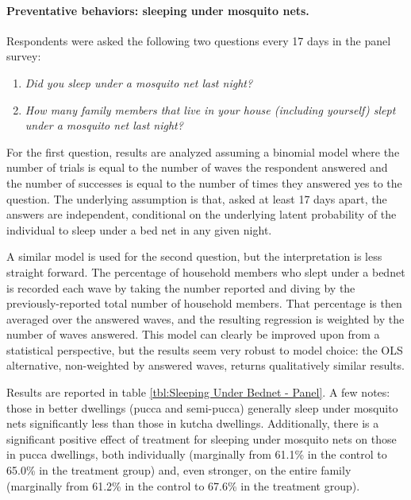 \documentclass[a4paper,12pt]{article}
\theoremstyle{proposition}
\begin{document}
\paragraph{Preventative behaviors: sleeping under mosquito nets.} Respondents were asked the following two questions every 17 days in the panel survey:

\begin{enumerate}
\item \textit{Did you sleep under a mosquito net last night?}
\item \textit{How many family members that live in your house (including yourself) slept under a mosquito net last night?}
\end{enumerate}

For the first question, results are analyzed assuming a binomial model where the number of trials is equal to the number of waves the respondent answered and the number of successes is equal to the number of times they answered yes to the question. The underlying assumption is that, asked at least 17 days apart, the answers are independent, conditional on the underlying latent probability of the individual to sleep under a bed net in any given night.

A similar model is used for the second question, but the interpretation is less straight forward. The percentage of household members who slept under a bednet is recorded each wave by taking the number reported and diving by the previously-reported total number of household members. That percentage is then averaged over the answered waves, and the resulting regression is weighted by the number of waves answered. This model can clearly be improved upon from a statistical perspective, but the results seem very robust to model choice: the OLS alternative, non-weighted by answered waves, returns qualitatively similar results.


Results are reported in table \ref{tbl:Sleeping Under Bednet - Panel}. A few notes: those in better dwellings (pucca and semi-pucca) generally sleep under mosquito nets significantly less than those in kutcha dwellings. Additionally, there is a significant positive effect of treatment for sleeping under mosquito nets on those in pucca dwellings, both individually (marginally from 61.1\% in the control to 65.0\% in the treatment group) and, even stronger, on the entire family (marginally from 61.2\% in the control to 67.6\% in the treatment group).



\end{document}
